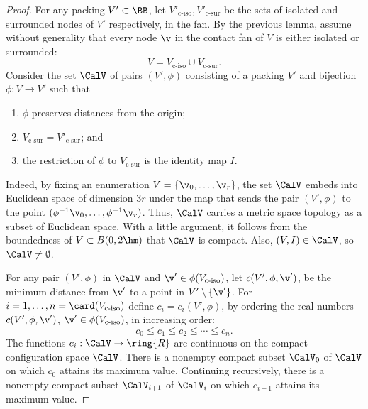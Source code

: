 \begin{proof} For any packing $V'\subset \BB$, let $V'_{\text{c-iso}},V'_{\text{c-sur}}$
  be the sets of isolated and surrounded nodes of $V'$
  respectively, in the  fan.  By the previous lemma,
  assume without generality that every node $\v$ in the contact fan
  of $V$ is either isolated or surrounded:
\[ 
V = V_{\text{c-iso}} \cup V_{\text{c-sur}}.
\] 
Consider the set $\CalV$ of pairs $(V',\phi)$ consisting of a packing $V'$
and bijection $\phi:V\to V'$ such that
\begin{enumerate}\wasitemize 
\item $\phi$ preserves distances from the origin;
\item $V_{\text{c-sur}}=V'_{\text{c-sur}}$; and 
\item the restriction of $\phi$ to $V_{\text{c-sur}}$ is the identity map $I$.
\end{enumerate}\wasitemize 
{}%
%

Indeed, by fixing an enumeration $V = \{\v_0,\ldots,\v_r\}$, the set
$\CalV$ embeds into Euclidean space of dimension $3r$ under the map
that sends the pair $(V',\phi)$ to the point
$(\phi^{-1}\v_0,\ldots,\phi^{-1}\v_r)$.  Thus, $\CalV$ carries a
metric space topology as a subset of Euclidean space.  With a little
argument, it follows from the boundedness of $V\subset B(0,2\hm)$ that
$\CalV$ is compact.  Also, $(V,I)\in \CalV$, so $\CalV\ne\emptyset$.


For any pair $(V',\phi)$ in $\CalV$ and $\v'\in \phi(V_{\text{c-iso}})$, let
$c(V',\phi,\v')$, be the minimum distance from $\v'$ to a point in
$V'\setminus \{\v'\}$.  For $i=1,\ldots,n=\card(V_{\text{c-iso}})$ define
$c_i=c_i(V',\phi)$, by ordering the real numbers
$c(V',\phi,\v')$, $\v'\in\phi(V_{\text{c-iso}})$, in increasing order:
\[ 
c_0 \le c_1 \le c_2 \le \cdots \le c_n.
\] 
The functions $c_i:\CalV\to\ring{R}$ are  continuous on the
compact configuration space $\CalV$.  There is a nonempty compact
subset $\CalV_0$ of $\CalV$ on which $c_0$ attains its maximum
value. Continuing recursively, there is a nonempty compact subset
$\CalV_{i+1}$ of $\CalV_{i}$ on which $c_{i+1}$ attains its maximum value.
%
%


\end{proof}
